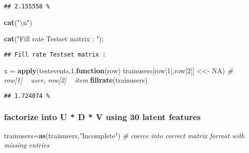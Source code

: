 \documentclass[]{article}
\newenvironment{Shaded}{\begin{snugshade}}{\end{snugshade}}
\newcommand{\CharTok}[1]{\textcolor[rgb]{0.31,0.60,0.02}{#1}}
\newcommand{\CommentTok}[1]{\textcolor[rgb]{0.56,0.35,0.01}{\textit{#1}}}
\newcommand{\ControlFlowTok}[1]{\textcolor[rgb]{0.13,0.29,0.53}{\textbf{#1}}}
\newcommand{\DecValTok}[1]{\textcolor[rgb]{0.00,0.00,0.81}{#1}}
\newcommand{\KeywordTok}[1]{\textcolor[rgb]{0.13,0.29,0.53}{\textbf{#1}}}
\newcommand{\NormalTok}[1]{#1}
\newcommand{\OtherTok}[1]{\textcolor[rgb]{0.56,0.35,0.01}{#1}}
\newcommand{\StringTok}[1]{\textcolor[rgb]{0.31,0.60,0.02}{#1}}
\begin{document}
\begin{verbatim}
## 2.155558 %
\end{verbatim}

\begin{Shaded}
\begin{Highlighting}[]
\KeywordTok{cat}\NormalTok{(}\StringTok{"}\CharTok{\textbackslash{}n}\StringTok{"}\NormalTok{)}
\end{Highlighting}
\end{Shaded}

\begin{Shaded}
\begin{Highlighting}[]
\KeywordTok{cat}\NormalTok{(}\StringTok{"Fill rate Testset matrix : "}\NormalTok{); }
\end{Highlighting}
\end{Shaded}

\begin{verbatim}
## Fill rate Testset matrix :
\end{verbatim}

\begin{Shaded}
\begin{Highlighting}[]
\NormalTok{x =}\StringTok{ }\KeywordTok{apply}\NormalTok{(testevents,}\DecValTok{1}\NormalTok{,}\ControlFlowTok{function}\NormalTok{(row) trainusers[row[}\DecValTok{1}\NormalTok{],row[}\DecValTok{2}\NormalTok{]] <<-}\StringTok{ }\OtherTok{NA}\NormalTok{) }\CommentTok{# row[1] ~ user, row[2] ~ item}
\KeywordTok{fillrate}\NormalTok{(trainusers)}
\end{Highlighting}
\end{Shaded}

\begin{verbatim}
## 1.724074 %
\end{verbatim}

\hypertarget{factorize-into-u-d-v-using-30-latent-features}{%
\subsubsection{factorize into U * D * V using 30 latent
features}\label{factorize-into-u-d-v-using-30-latent-features}}

\begin{Shaded}
\begin{Highlighting}[]
\NormalTok{trainusers=}\KeywordTok{as}\NormalTok{(trainusers,}\StringTok{"Incomplete"}\NormalTok{) }\CommentTok{# coerce into correct matrix format with missing entries}
\end{Highlighting}
\end{Shaded}
\end{document}
